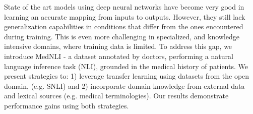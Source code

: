 State of the art models using deep neural networks have become very good in learning an accurate mapping from inputs to outputs. However, they still lack generalization capabilities in conditions that differ from the ones encountered during training. This is even more challenging in specialized, and knowledge intensive domains, where training data is limited. To address this gap, we introduce MedNLI - a dataset annotated by doctors, performing a natural language inference task (NLI), grounded in the medical history of patients. We present strategies to: 1) leverage transfer learning using datasets from the open domain, (e.g. SNLI) and 2) incorporate domain knowledge from external data and lexical sources (e.g. medical terminologies). Our results demonstrate performance gains using both strategies.
